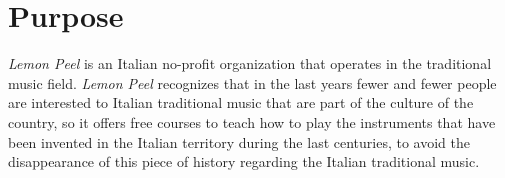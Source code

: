 \documentclass[../../DD.tex]{subfiles}
\begin{document}
\section{Purpose}
\textit{Lemon Peel} is an Italian no-profit organization that operates in the traditional music field. \textit{Lemon Peel} recognizes that in the last years fewer and fewer people are interested to Italian traditional music that are part of the culture of the country, so it offers free courses to teach how to play the instruments that have been invented in the Italian territory during the last centuries, to avoid the disappearance of this piece of history regarding the Italian traditional music. 
\end{document}
